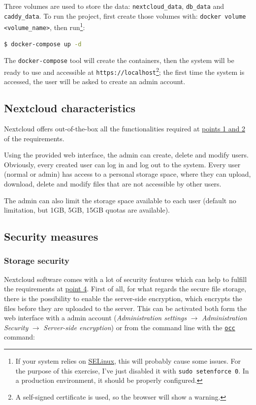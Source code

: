 Three volumes are used to store the data: \texttt{nextcloud\_data}, \texttt{db\_data} and \texttt{caddy\_data}. 
To run the project, first create those volumes with: \texttt{docker volume <volume\_name>}, then run\footnote{If your system relies on \href{https://www.redhat.com/en/topics/linux/what-is-selinux}{SELinux}, this will probably cause some issues. For the purpose of this exercise, I've just disabled it with \texttt{sudo setenforce 0}. In a production environment, it should be properly configured.}:
\begin{lstlisting}[language=bash]
$ docker-compose up -d
\end{lstlisting}
The \texttt{docker-compose} tool will create the containers, then the system will be ready to use and accessible at \texttt{https://localhost}\footnote{A self-signed certificate is used, so the browser will show a warning.}; the first time the system is accessed, the user will be asked to create an admin account.

\subsection{Nextcloud characteristics}
\label{subsec:nextcloud}

Nextcloud offers out-of-the-box all the functionalities required at \hyperref[subsec:requirements]{points 1 and 2} of the requirements.

Using the provided web interface, the admin can create, delete and modify users.
Obviously, every created user can log in and log out to the system.
Every user (normal or admin) has access to a personal storage space, where they can upload, download, delete and modify files that are not accessible by other users.

The admin can also limit the storage space available to each user (default no limitation, but 1GB, 5GB, 15GB quotas are available).

\subsection{Security measures}
\label{subsec:security}

\subsubsection{Storage security}
Nextcloud software comes with a lot of security features which can help to fulfill the requirements at \hyperref[subsec:requirements]{point 4}.
First of all, for what regards the secure file storage, there is the possibility to enable the server-side encryption, which encrypts the files before they are uploaded to the server.
This can be activated both form the web interface with a admin account (\textit{Administration settings} $\rightarrow$ \textit{Administration Security} $\rightarrow$ \textit{Server-side encryption})
or from the command line with the \href{https://docs.nextcloud.com/server/latest/admin_manual/configuration_server/occ_command.html}{\texttt{occ}} command:

